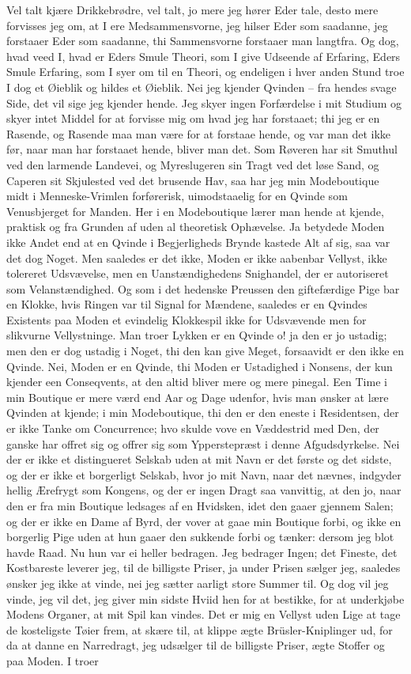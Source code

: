 \documentclass[12pt,a4paper]{article}
\begin{document}
Vel talt kjære Drikkebrødre, vel talt, jo mere jeg hører Eder tale, desto mere forvisses jeg om, at I ere Medsammensvorne, jeg hilser Eder som saadanne, jeg forstaaer Eder som saadanne, thi Sammensvorne forstaaer man langtfra. Og dog, hvad veed I, hvad er Eders Smule Theori, som I give Udseende af Erfaring, Eders Smule Erfaring, som I syer om til en Theori, og endeligen i hver anden Stund troe I dog et Øieblik og hildes et Øieblik. Nei jeg kjender Qvinden – fra hendes svage Side, det vil sige jeg kjender hende. Jeg skyer ingen Forfærdelse i mit Studium og skyer intet Middel for at forvisse mig om hvad jeg har forstaaet; thi jeg er en Rasende, og Rasende maa man være for at forstaae hende, og var man det ikke før, naar man har forstaaet hende, bliver man det. Som Røveren har sit Smuthul ved den larmende Landevei, og Myreslugeren sin Tragt ved det løse Sand, og Caperen sit Skjulested ved det brusende Hav, saa har jeg min Modeboutique midt i Menneske-Vrimlen forførerisk, uimodstaaelig for en Qvinde som Venusbjerget for Manden. Her i en Modeboutique lærer man hende at kjende, praktisk og fra Grunden af uden al theoretisk Ophævelse. Ja betydede Moden ikke Andet end at en Qvinde i Begjerligheds Brynde kastede Alt af sig, saa var det dog Noget. Men saaledes er det ikke, Moden er ikke aabenbar Vellyst, ikke tolereret Udsvævelse, men en Uanstændighedens Snighandel, der er autoriseret som Velanstændighed. Og som i det hedenske Preussen den giftefærdige Pige bar en Klokke, hvis Ringen var til Signal for Mændene, saaledes er en Qvindes Existents paa Moden et evindelig Klokkespil ikke for Udsvævende men for slikvurne Vellystninge. Man troer Lykken er en Qvinde o! ja den er jo ustadig; men den er dog ustadig i Noget, thi den kan give Meget, forsaavidt er den ikke en Qvinde. Nei, Moden er en Qvinde, thi Moden er Ustadighed i Nonsens, der kun kjender een Conseqvents, at den altid bliver mere og mere pinegal. Een Time i min Boutique er mere værd end Aar og Dage udenfor, hvis man ønsker at lære Qvinden at kjende; i min Modeboutique, thi den er den eneste i Residentsen, der er ikke Tanke om Concurrence; hvo skulde vove en Væddestrid med Den, der ganske har offret sig og offrer sig som Ypperstepræst i denne Afgudsdyrkelse. Nei der er ikke et distingueret Selskab uden at mit Navn er det første og det sidste, og der er ikke et borgerligt Selskab, hvor jo mit Navn, naar det nævnes, indgyder hellig Ærefrygt som Kongens, og der er ingen Dragt saa vanvittig, at den jo, naar den er fra min Boutique ledsages af en Hvidsken, idet den gaaer gjennem Salen; og der er ikke en Dame af Byrd, der vover at gaae min Boutique forbi, og ikke en borgerlig Pige uden at hun gaaer den sukkende forbi og tænker: dersom jeg blot havde Raad. Nu hun var ei heller bedragen. Jeg bedrager Ingen; det Fineste, det Kostbareste leverer jeg, til de billigste Priser, ja under Prisen sælger jeg, saaledes ønsker jeg ikke at vinde, nei jeg sætter aarligt store Summer til. Og dog vil jeg vinde, jeg vil det, jeg giver min sidste Hviid hen for at bestikke, for at underkjøbe Modens Organer, at mit Spil kan vindes. Det er mig en Vellyst uden Lige at tage de kosteligste Tøier frem, at skære til, at klippe ægte Brüsler-Kniplinger ud, for da at danne en Narredragt, jeg udsælger til de billigste Priser, ægte Stoffer og paa Moden. I troer 
\end{document}
